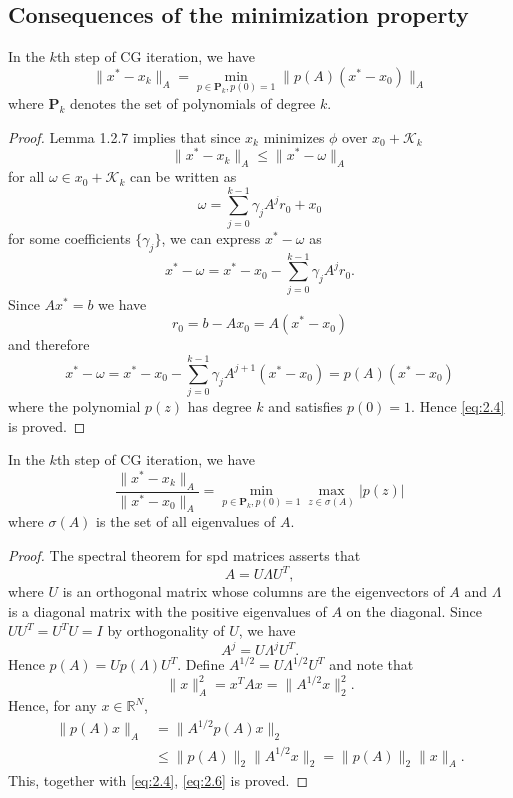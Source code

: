 \subsection{Consequences of the minimization property}
\label{sec:2.2}

\begin{lemma}
  In the $k$th step of CG iteration, we have
  \begin{equation}
    \label{eq:2.4}
    \|x^*-x_k\|_A=\min_{p\in\mathbf{P}_k,p(0)=1}\|p(A)(x^*-x_0)\|_A
  \end{equation}
  where $\mathbf{P}_k$ denotes the set of polynomials of degree $k$.
\end{lemma}

\begin{proof}
  Lemma 1.2.7 implies that since $x_k$ minimizes $\phi$ over
  $x_0+\mathcal{K}_k$
  \begin{equation}
    \label{eq:2.3}
    \|x^*-x_k\|_A\leq\|x^*-\omega\|_A
  \end{equation}
  for all $\omega\in x_0+\mathcal{K}_k$ can be written as
  $$\omega = \sum\limits_{j=0}^{k-1}\gamma_jA^jr_0+x_0$$
  for some coefficients $\{\gamma_j\}$, we can express $x^*-\omega$ as
  $$x^*-\omega=x^*-x_0-\sum\limits_{j=0}^{k-1}\gamma_jA^jr_0.$$
  Since $Ax^*=b$ we have $$r_0=b-Ax_0=A(x^*-x_0)$$ and therefore
  $$x^*-\omega=x^*-x_0-\sum\limits_{j=0}^{k-1}\gamma_jA^{j+1}(x^*-x_0)=p(A)(x^*-x_0)$$
  where the polynomial $p(z)$ has degree $k$ and satisfies
  $p(0)=1$. Hence \eqref{eq:2.4} is proved.
\end{proof}

\begin{lemma}
  In the $k$th step of CG iteration, we have 
  \begin{equation}
  \label{eq:2.6}
    \frac{\|x^*-x_k\|_A}{\|x^*-x_0\|_A}=\min_{p\in\mathbf{P}_k,p(0)=1}\max_{z\in\sigma(A)}|p(z)|
  \end{equation}
  where  $\sigma(A)$ is the set of all eigenvalues of $A$.
\end{lemma}

\begin{proof}
  The spectral theorem for spd matrices asserts that $$A=U\Lambda
  U^T,$$
  where $U$ is an orthogonal matrix whose columns are the eigenvectors
  of $A$ and $\Lambda$ is a diagonal matrix with the positive
  eigenvalues of $A$ on the diagonal. Since $UU^T=U^TU=I$ by
  orthogonality of $U$, we have $$A^j=U\Lambda^jU^T.$$
  Hence $p(A)=Up(\Lambda)U^T$. Define $A^{1/2}=U\Lambda^{1/2}U^T$ and
  note that
  \begin{equation}
    \label{eq:2.5}
    \|x\|_A^2 = x^TAx = \|A^{1/2}x\|_2^2.
  \end{equation}
  Hence, for any $x\in\mathbb{R}^N$,
  \begin{equation*}
    \begin{aligned}
      \|p(A)x\|_A&=\|A^{1/2}p(A)x\|_2\\
      &\leq\|p(A)\|_2\|A^{1/2}x\|_2=\|p(A)\|_2\|x\|_A.
    \end{aligned}
  \end{equation*}
  This, together with \eqref{eq:2.4}, \eqref{eq:2.6} is proved.
\end{proof}

